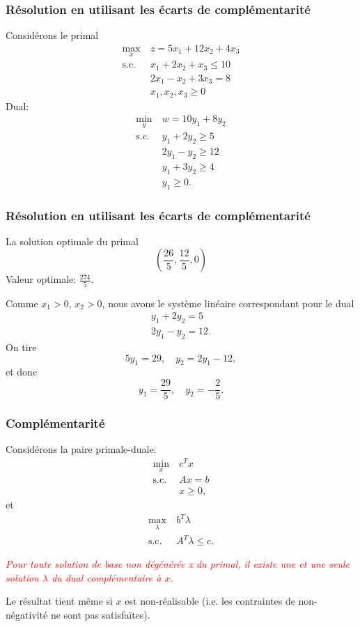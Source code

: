 \documentclass[usepdftitle=false]{beamer}
\begin{document}
\begin{frame}
	\frametitle{Résolution en utilisant les écarts de complémentarité}
	
	Considérons le primal
	\begin{align*}
		\max_x\ & z = 5x_1 +12x_2 +4x_3\\
		\mbox{s.c. } & x_1 + 2x_2 + x_3 \leq 10 \\
		& 2x_1 - x_2 +3x_3 = 8 \\
		& x_1, x_2, x_3 \geq 0
	\end{align*}
	Dual:
	\begin{align*}
		\min_y\ & w = 10y_1 + 8y_2 \\
		\mbox{s.c. } & y_1 + 2y_2 \geq 5 \\
		& 2y_1 - y_2 \geq 12 \\
		& y_1 + 3y_2 \geq 4\\
		& y_1 \geq 0.
	\end{align*}
	
\end{frame}

\begin{frame}
	\frametitle{Résolution en utilisant les écarts de complémentarité}
	
	La solution optimale du primal
	\[
	\left(
	\frac{26}{5}, \frac{12}{5}, 0
	\right)
	\]
	Valeur optimale: $\frac{274}{5}$.
	
	\mbox{}
	
	Comme $x_1 > 0$, $x_2 > 0$, nous avons le système linéaire correspondant pour le dual
	\begin{align*}
		y_1 + 2y_2 = 5\\
		2y_1 - y_2 = 12.
	\end{align*}
	On tire
	\[
	5y_1 = 29,\quad y_2 = 2y_1 - 12,
	\]
	et donc
	\[
	y_1 = \frac{29}{5},\quad y_2 = -\frac{2}{5}.
	\]
	
\end{frame}

\begin{frame}
	\frametitle{Complémentarité}
	
	Considérons la paire primale-duale:
	\begin{align*}
		\min_x\ & c^T x \\
		\mbox{s.c. } & Ax = b \\
		& x \geq 0,
	\end{align*}
	et
	\begin{align*}
		\max_{\lambda} \ & b^T \lambda \\
		\mbox{s.c. } & A^T \lambda \leq c.
	\end{align*}
	
	\textcolor{red}{\textit{Pour toute solution de base non dégénérée x du primal, il existe une et une seule solution $\lambda$ du dual complémentaire à $x$.}}
	
	Le résultat tient même si $x$ est non-réalisable (i.e. les contraintes de non-négativité ne sont pas satisfaites).
	
\end{frame}
\end{document}
